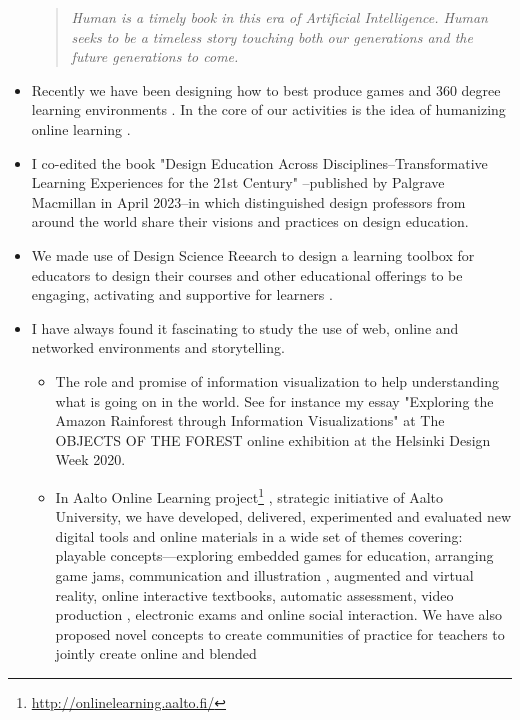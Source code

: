 \documentclass[11pt,letterpaper]{article}
\newenvironment{itquote}
{\begin{quote}\itshape}
{\end{quote}}
\begin{document}
\begin{itemize}
\begin{itquote}
Human is a timely book in this era of Artificial Intelligence. Human seeks to be a timeless story touching both our generations and the future generations to come.
\end{itquote}
  \item Recently we have been designing how to best produce games \cite{gamejams-2021,game-production-2022,Promotypes2023} and 360 degree learning environments \cite{production-pipeline-360}. In the core of our activities is the idea of humanizing online learning \cite{humanizing-2024}.
  \item I co-edited the book "Design Education Across Disciplines--Transformative Learning Experiences for the 21st Century" \cite{DesignEducation2023}--published by Palgrave Macmillan in April 2023--in which distinguished design professors from around the world share their visions and practices on design education.
  \item We made use of Design Science Reearch to design a learning toolbox for educators to design their courses and other educational offerings to be engaging, activating and supportive for learners \cite{designing-toolbox-2022}.
  \item I have always found it fascinating to study the use of web, online and
  networked environments and storytelling. 
   \begin{itemize}
    \item The role and promise of information visualization to help understanding what is going on in the world. See for instance my essay "Exploring the Amazon Rainforest through Information Visualizations" \cite{exploration-2020} at The OBJECTS OF THE FOREST online exhibition at the Helsinki Design Week 2020.
    \item In Aalto Online Learning
    project\footnote{\url{http://onlinelearning.aalto.fi/}}
    \cite{advancing-2021,aalto-online-learning-2017,transforming-uni-2018,designing-learning-2020}, strategic
    initiative of Aalto University, we have developed, delivered, experimented and evaluated new digital tools and online materials in a wide set of themes covering:
    playable concepts---exploring embedded games for education, arranging game jams\cite{gamejames-2021}, communication and illustration \cite{playable-concepts-2020}, augmented and virtual reality, online interactive textbooks, automatic
    assessment, video production \cite{era-of-online-videos-2018}, electronic exams
     and online social interaction. We have also proposed novel concepts to
     create communities of practice for teachers to jointly create online and blended

\end{itemize}
\end{itemize}
\end{document}
